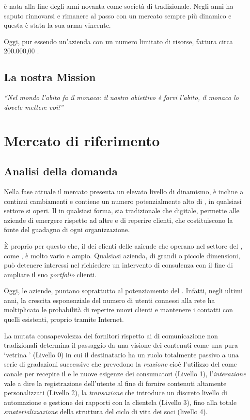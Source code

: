 \customer è nata alla fine degli anni novanta come società di  tradizionale. Negli anni ha saputo rinnovarsi e rimanere al passo con un mercato sempre più dinamico e questa è stata la sua arma vincente.

Oggi, pur essendo un'azienda con un numero limitato di risorse, fattura circa  200.000,00 \text{\euro}.

\section{La nostra Mission}

\textit{``Nel mondo l'abito fa il monaco: il nostro obiettivo è farvi l'abito, il monaco lo dovete mettere voi!''}

\chapter{Mercato di riferimento}
\section{Analisi della domanda}\label{sec:domanda}

Nella fase attuale il mercato presenta un elevato livello di dinamismo, è incline a continui cambiamenti e contiene un numero potenzialmente alto di , in qualsiasi settore si operi. Il \mktg in qualsiasi forma, sia tradizionale che digitale, permette alle aziende di emergere rispetto ad altre e di reperire clienti, che costituiscono la fonte del guadagno di ogni organizzazione.

È  proprio per questo che, il  dei clienti delle aziende che operano nel settore del \mktg, come \customer, è molto vario e ampio. Qualsiasi azienda, di grandi o piccole dimensioni, può detenere interessi nel richiedere un intervento di consulenza \mktg con il fine di ampliare il suo \textit{portfolio} clienti.

Oggi, le aziende, puntano soprattutto al potenziamento del \mktg {}. Infatti, negli ultimi anni, la crescita esponenziale del numero di utenti connessi alla rete ha moltiplicato le probabilità di reperire nuovi clienti e mantenere i contatti con quelli esistenti, proprio tramite Internet.

La mutata consapevolezza dei fornitori rispetto ai  di comunicazione non tradizionali determina il passaggio da una visione dei contenuti  come una pura `vetrina ' (Livello 0) in cui il destinatario ha un ruolo totalmente passivo a una serie di gradazioni successive che prevedono la \emph{reazione} cioè l'utilizzo del  come canale per recepire il  e le nuove esigenze dei consumatori (Livello 1), l'\emph{interazione} vale a dire la registrazione dell'utente al fine di fornire contenuti altamente personalizzati (Livello 2), la \emph{transazione} che introduce un discreto livello di automazione e gestione dei rapporti con la clientela (Livello 3), fino alla totale \emph{smaterializzazione} della struttura del ciclo di vita dei soci (livello 4).

